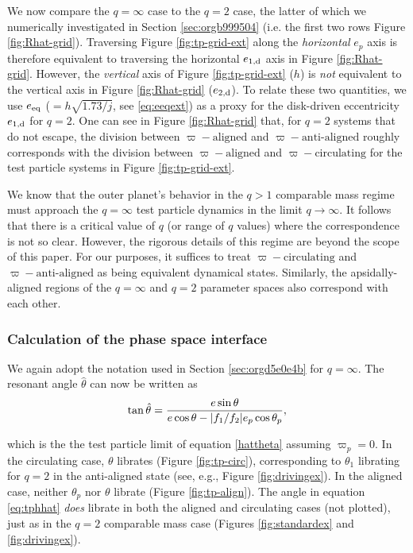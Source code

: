 \documentclass[usenatbib,twocolumn]{mnras}
\DeclarePairedDelimiter{\abs}{|}{|}
\begin{document}
We now compare the \(q=\infty\) case to the \(q=2\) case, the latter of
which we numerically investigated in Section \ref{sec:orgb999504} (i.e. the
first two rows Figure \ref{fig:Rhat-grid}).  Traversing Figure
\ref{fig:tp-grid-ext} along the \emph{horizontal} \(e_p\) axis is therefore
equivalent to traversing the horizontal \(e_{1,\rm d}\) axis in Figure
\ref{fig:Rhat-grid}.  However, the \emph{vertical} axis of Figure
\ref{fig:tp-grid-ext} (\(h\)) is \emph{not} equivalent to the vertical axis in
Figure \ref{fig:Rhat-grid} (\(e_{2,\rm d}\)).  To relate these two
quantities, we use \(e_{\rm eq}\) (\(= h\sqrt{1.73/j}\), see
\eqref{eq:eeqext}) as a proxy for the disk-driven eccentricity \(e_{1,\rm
d}\) for \(q=2\).  One can see in Figure \ref{fig:Rhat-grid} that, for
\(q=2\) systems that do not escape, the division between
\(\varpi-\text{aligned}\) and \(\varpi-\text{anti-aligned}\) roughly
corresponds with the division between \(\varpi-\text{aligned}\) and
\(\varpi-\text{circulating}\) for the test particle systems in Figure
\ref{fig:tp-grid-ext}.

We know that the outer planet's behavior in the \(q>1\) comparable mass
regime must approach the \(q=\infty\) test particle dynamics in the
limit \(q\to\infty\).  It follows that there is a critical value of \(q\)
(or range of \(q\) values) where the correspondence is not so clear.
However, the rigorous details of this regime are beyond the scope of
this paper.  For our purposes, it suffices to treat
\(\varpi-\text{circulating}\) and \(\varpi-\text{anti-aligned}\) as being
equivalent dynamical states.  Similarly, the
apsidally-aligned regions of the \(q=\infty\) and \(q=2\) parameter spaces
also correspond with each other.

\subsubsection{Calculation of the phase space interface}
\label{sec:orgd4fc5e7}
We again adopt the notation used in Section \ref{sec:orgd5e0e4b} for \(q=\infty\).
The resonant angle \(\hat\theta\) can now be written as
\begin{align}
  \label{eq:tphhat}
  \tan\hat\theta = \frac{e\sin\theta}{e\cos\theta - \abs{f_1/f_2}e_p\cos\theta_p},
\end{align}

\noindent which is the the test particle limit of equation
\eqref{hattheta} assuming \(\varpi_p=0\).  In the circulating case,
\(\theta\) librates (Figure \ref{fig:tp-circ}), corresponding to
\(\theta_1\) librating for \(q=2\) in the anti-aligned state (see, e.g.,
Figure \ref{fig:drivingex}).  In the aligned case, neither \(\theta_p\)
nor \(\theta\) librate (Figure \ref{fig:tp-align}).  The angle in
equation \eqref{eq:tphhat} \emph{does} librate in both the aligned
and circulating cases (not plotted), just as in the \(q=2\) comparable mass case
(Figures \ref{fig:standardex} and \ref{fig:drivingex}).
\end{document}
